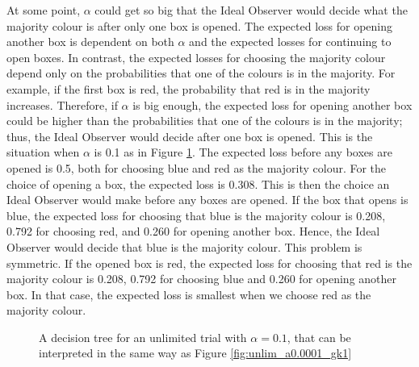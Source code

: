 At some point, $\alpha$ could get so big that the Ideal Observer would decide what the majority colour is after only one box is opened. The expected loss for opening another box is dependent on both $\alpha$ and the expected losses for continuing to open boxes. In contrast, the expected losses for choosing the majority colour depend only on the probabilities that one of the colours is in the majority. For example, if the first box is red, the probability that red is in the majority increases. Therefore, if $\alpha$ is big enough, the expected loss for opening another box could be higher than the probabilities that one of the colours is in the majority; thus, the Ideal Observer would decide after one box is opened. This is the situation when $\alpha$ is 0.1 as in Figure \ref{fig:unlim_a0.1_gk1}. The expected loss before any boxes are opened is 0.5, both for choosing blue and red as the majority colour. For the choice of opening a box, the expected loss is 0.308. This is then the choice an Ideal Observer would make before any boxes are opened. If the box that opens is blue, the expected loss for choosing that blue is the majority colour is 0.208, 0.792 for choosing red, and 0.260 for opening another box. Hence, the Ideal Observer would decide that blue is the majority colour. This problem is symmetric. If the opened box is red, the expected loss for choosing that red is the majority colour is 0.208, 0.792 for choosing blue and 0.260 for opening another box. In that case, the expected loss is smallest when we choose red as the majority colour.
\begin{figure}
    \centering
    \scalebox{1}{}
    \caption[IO solution, unlimited. $\alpha=0.1$,$\gamma=\kappa=1$]{A decision tree for an unlimited trial with $\alpha = 0.1$, that can be interpreted in the same way as Figure \ref{fig:unlim_a0.0001_gk1}}
    \label{fig:unlim_a0.1_gk1}
\end{figure}


